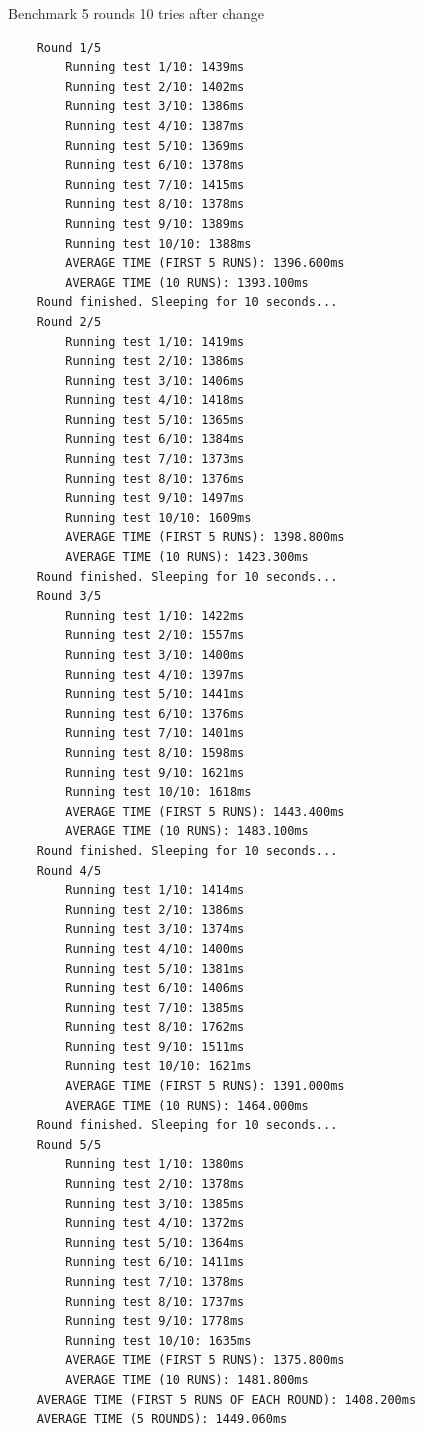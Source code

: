 Benchmark 5 rounds 10 tries after change
\footnotesize\begin{verbatim}
    Round 1/5
        Running test 1/10: 1439ms
        Running test 2/10: 1402ms
        Running test 3/10: 1386ms
        Running test 4/10: 1387ms
        Running test 5/10: 1369ms
        Running test 6/10: 1378ms
        Running test 7/10: 1415ms
        Running test 8/10: 1378ms
        Running test 9/10: 1389ms
        Running test 10/10: 1388ms
        AVERAGE TIME (FIRST 5 RUNS): 1396.600ms
        AVERAGE TIME (10 RUNS): 1393.100ms
    Round finished. Sleeping for 10 seconds...
    Round 2/5
        Running test 1/10: 1419ms
        Running test 2/10: 1386ms
        Running test 3/10: 1406ms
        Running test 4/10: 1418ms
        Running test 5/10: 1365ms
        Running test 6/10: 1384ms
        Running test 7/10: 1373ms
        Running test 8/10: 1376ms
        Running test 9/10: 1497ms
        Running test 10/10: 1609ms
        AVERAGE TIME (FIRST 5 RUNS): 1398.800ms
        AVERAGE TIME (10 RUNS): 1423.300ms
    Round finished. Sleeping for 10 seconds...
    Round 3/5
        Running test 1/10: 1422ms
        Running test 2/10: 1557ms
        Running test 3/10: 1400ms
        Running test 4/10: 1397ms
        Running test 5/10: 1441ms
        Running test 6/10: 1376ms
        Running test 7/10: 1401ms
        Running test 8/10: 1598ms
        Running test 9/10: 1621ms
        Running test 10/10: 1618ms
        AVERAGE TIME (FIRST 5 RUNS): 1443.400ms
        AVERAGE TIME (10 RUNS): 1483.100ms
    Round finished. Sleeping for 10 seconds...
    Round 4/5
        Running test 1/10: 1414ms
        Running test 2/10: 1386ms
        Running test 3/10: 1374ms
        Running test 4/10: 1400ms
        Running test 5/10: 1381ms
        Running test 6/10: 1406ms
        Running test 7/10: 1385ms
        Running test 8/10: 1762ms
        Running test 9/10: 1511ms
        Running test 10/10: 1621ms
        AVERAGE TIME (FIRST 5 RUNS): 1391.000ms
        AVERAGE TIME (10 RUNS): 1464.000ms
    Round finished. Sleeping for 10 seconds...
    Round 5/5
        Running test 1/10: 1380ms
        Running test 2/10: 1378ms
        Running test 3/10: 1385ms
        Running test 4/10: 1372ms
        Running test 5/10: 1364ms
        Running test 6/10: 1411ms
        Running test 7/10: 1378ms
        Running test 8/10: 1737ms
        Running test 9/10: 1778ms
        Running test 10/10: 1635ms
        AVERAGE TIME (FIRST 5 RUNS): 1375.800ms
        AVERAGE TIME (10 RUNS): 1481.800ms
    AVERAGE TIME (FIRST 5 RUNS OF EACH ROUND): 1408.200ms
    AVERAGE TIME (5 ROUNDS): 1449.060ms
\end{verbatim}
\normalsize

